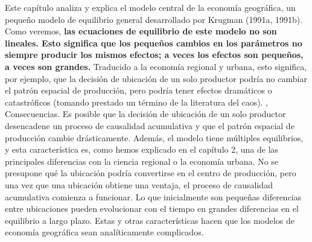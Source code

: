 Este capítulo analiza y explica el modelo central de la economía geográfica, un pequeño modelo de equilibrio general desarrollado por Krugman (1991a, 1991b). Como veremos, \textbf{las ecuaciones de equilibrio de este modelo no son lineales. Esto significa que los pequeños cambios en los parámetros no siempre producir los mismos efectos; a veces los efectos son pequeños, a veces son grandes.} Traducido a la economía regional y urbana, esto significa, por ejemplo, que la decisión de ubicación de un solo productor podría no cambiar el patrón espacial de producción, pero podría tener efectos dramáticos o catastróficos (tomando prestado un término de la literatura del caos). , Consecuencias. Es posible que la decisión de ubicación de un solo productor desencadene un proceso de causalidad acumulativa y que el patrón espacial de producción cambie drásticamente. Además, el modelo tiene múltiples equilibrios, y esta característica es, como hemos explicado en el capítulo 2, una de las principales diferencias con la ciencia regional o la economía urbana. No se presupone qué la ubicación podría convertirse en el centro de producción, pero una vez que una ubicación obtiene una ventaja, el proceso de causalidad acumulativa comienza a funcionar. Lo que inicialmente son pequeñas diferencias entre ubicaciones pueden evolucionar con el tiempo en grandes diferencias en el equilibrio a largo plazo. Estas y otras características hacen que los modelos de economía geográfica sean analíticamente complicados.\\

